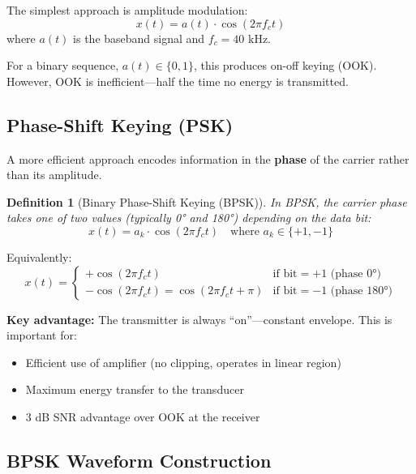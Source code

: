 \documentclass[11pt]{article}
\newtheorem{definition}{Definition}
\begin{document}
The simplest approach is amplitude modulation:
\begin{equation}
x(t) = a(t) \cdot \cos(2\pi f_c t)
\end{equation}
where $a(t)$ is the baseband signal and $f_c = 40$ kHz.

For a binary sequence, $a(t) \in \{0, 1\}$, this produces on-off keying (OOK). However, OOK is inefficient---half the time no energy is transmitted.

\subsection{Phase-Shift Keying (PSK)}

A more efficient approach encodes information in the \textbf{phase} of the carrier rather than its amplitude.

\begin{definition}[Binary Phase-Shift Keying (BPSK)]
In BPSK, the carrier phase takes one of two values (typically 0° and 180°) depending on the data bit:
\begin{equation}
x(t) = a_k \cdot \cos(2\pi f_c t) \quad \text{where } a_k \in \{+1, -1\}
\end{equation}
\end{definition}

Equivalently:
\begin{equation}
x(t) = \begin{cases}
+\cos(2\pi f_c t) & \text{if bit} = +1 \text{ (phase 0°)} \\
-\cos(2\pi f_c t) = \cos(2\pi f_c t + \pi) & \text{if bit} = -1 \text{ (phase 180°)}
\end{cases}
\end{equation}

\textbf{Key advantage:} The transmitter is always ``on''---constant envelope. This is important for:
\begin{itemize}
    \item Efficient use of amplifier (no clipping, operates in linear region)
    \item Maximum energy transfer to the transducer
    \item 3 dB SNR advantage over OOK at the receiver
\end{itemize}

\subsection{BPSK Waveform Construction}
\end{document}
